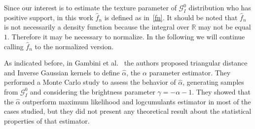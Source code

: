 \documentclass[journal]{IEEEtran}
\numberwithin{equation}{section}
\newcommand{\R}{\ensuremath{\mathbb{R}}}
\begin{document}
Since our interest is to estimate the texture parameter of $\mathcal{G}_I^{0}$ distribution who has positive support, in this work $\widehat{f}_n$ is defined as in~\eqref{fn}. It should be noted that $\widehat{f}_n$ is not necessarily a density function because the integral over $\R$ may not be equal $1$. Therefore it may be necessary to normalize. In the following we will continue calling $\widehat{f}_n$ to the normalized version. 

As indicated before, in Gambini et al.~\cite{gambini2015} the authors proposed triangular distance and Inverse Gaussian kernels to define $\widehat{\alpha}$, the $\alpha$ parameter estimator. They performed a Monte Carlo study to assess the  behavior of $\widehat{\alpha}$, generating samples from $\mathcal{G}_I^{0}$ and considering the brightness parameter $\gamma =-\alpha-1$. They showed that the $\widehat{\alpha}$ outperform maximum likelihood and logcumulants estimator in most of the cases studied, but they did not present any theoretical result about the statistical properties of that estimator. 
\end{document}
